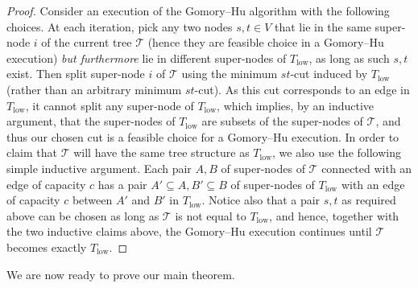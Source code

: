 \documentclass{toc}
\theoremstyle{plain}
\newcommand{\T}{\mathcal{T}}
\begin{document}
\begin{proof}
  Consider an execution of the Gomory--Hu algorithm with the following choices.
  At each iteration, pick any two nodes $s,t\in V$
  that lie in the same super-node $i$ of the current tree $\T$
  (hence they are feasible choice in a Gomory--Hu execution)
  \emph{but furthermore} lie in different super-nodes of $T_{\mathrm{low}}$,
  as long as such $s,t$ exist.
  Then split super-node $i$ of $\T$ using the minimum $st$-cut induced by $T_{\mathrm{low}}$ (rather than an arbitrary minimum $st$-cut).
  As this cut corresponds to an edge in $T_{\mathrm{low}}$,
  it cannot split any super-node of $T_{\mathrm{low}}$,
  which implies, by an inductive argument,
  that the super-nodes of $T_{\mathrm{low}}$ are subsets of the super-nodes of $\T$,
  and thus our chosen cut is a feasible choice for a Gomory--Hu execution.
In order to claim that $\T$ will have the same tree structure as $T_{\mathrm{low}}$, we also use the following simple inductive argument.
Each pair $A,B$ of super-nodes of $\T$ connected with an edge of capacity $c$ has a pair $A'\subseteq A, B'\subseteq B$ of super-nodes of $T_{\mathrm{low}}$ with an edge of capacity $c$
%
between
$A'$ and $B'$ in $T_{\mathrm{low}}$.
  Notice also that a pair $s,t$ as required above can be chosen
  as long as $\T$ is not equal to $T_{\mathrm{low}}$, and hence, together with the two inductive claims above,
  the Gomory--Hu execution continues until $\T$ becomes exactly $T_{\mathrm{low}}$.
\end{proof}


\medskip
We are now ready to prove our main theorem.
\end{document}
